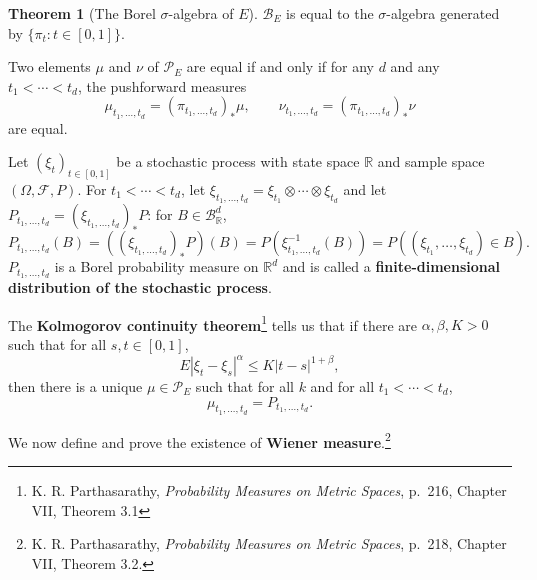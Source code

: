 \documentclass{article}
\theoremstyle{definition}
\newtheorem{theorem}{Theorem}
\theoremstyle{definition}
\begin{document}
\begin{theorem}[The Borel $\sigma$-algebra of $E$]
$\mathscr{B}_E$ is equal to the $\sigma$-algebra generated by $\{\pi_t: t \in [0,1]\}$.

Two elements $\mu$ and $\nu$ of $\mathscr{P}_E$ are equal if and only if for any $d$ and any $t_1<\cdots<t_d$, the pushforward measures
\[
\mu_{t_1,\ldots,t_d} = (\pi_{t_1,\ldots,t_d})_* \mu,\qquad
\nu_{t_1,\ldots,t_d} =  (\pi_{t_1,\ldots,t_d})_* \nu
\]
are equal.
\label{theorem21}
\end{theorem}



Let $(\xi_t)_{t \in [0,1]}$ be a stochastic process with state space $\mathbb{R}$ and sample space
$(\Omega,\mathscr{F},P)$. 
For $t_1<\cdots<t_d$,
let $\xi_{t_1,\ldots,t_d} = \xi_{t_1} \otimes \cdots \otimes \xi_{t_d}$ and
let $P_{t_1,\ldots,t_d} = (\xi_{t_1,\ldots,t_d})_*P$: for $B \in \mathscr{B}_{\mathbb{R}}^d$,  
\[
P_{t_1,\ldots,t_d}(B) = ((\xi_{t_1,\ldots,t_d})_*P)(B) = P(\xi_{t_1,\ldots,t_d}^{-1}(B))
=P((\xi_{t_1},\ldots,\xi_{t_d}) \in B).
\]
$P_{t_1,\ldots,t_d}$ is a Borel probability measure on $\mathbb{R}^d$ and is called a \textbf{finite-dimensional distribution
of the stochastic process}.

The \textbf{Kolmogorov continuity theorem}\footnote{K. R.
Parthasarathy, {\em Probability Measures on Metric Spaces}, p.~216, Chapter VII, Theorem 3.1}
tells us that if there are $\alpha,\beta,K>0$ 
such that  for all $s,t \in [0,1]$,
\[
E |\xi_t - \xi_s|^\alpha \leq K |t-s|^{1+\beta},
\]
then there is a unique $\mu \in \mathscr{P}_E$ such that for all $k$ and for all $t_1<\cdots<t_d$,
\[
\mu_{t_1,\ldots,t_d} = P_{t_1,\ldots,t_d}.
\]

We now define and prove the existence of \textbf{Wiener measure}.\footnote{K. R.
Parthasarathy, {\em Probability Measures on Metric Spaces}, p.~218, Chapter VII, Theorem 3.2.}
\end{document}

